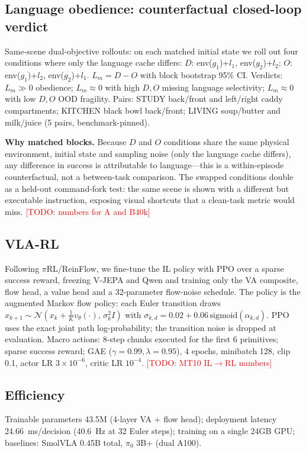 \documentclass[10pt,twocolumn]{article}
\newcommand{\todo}[1]{\textcolor{red}{[TODO: #1]}}
\begin{document}
\subsection{Language obedience: counterfactual closed-loop verdict}
\label{sec:obedience}
Same-scene dual-objective rollouts: on each matched initial state we roll out
four conditions where only the language cache differs:
$D$: env($g_1$)+$l_1$, env($g_2$)+$l_2$; $O$: env($g_1$)+$l_2$,
env($g_2$)+$l_1$. $L_m = D-O$ with block bootstrap 95\% CI. Verdicts:
$L_m\gg0$ obedience; $L_m\approx0$ with high $D,O$ missing language
selectivity; $L_m\approx0$ with low $D,O$ OOD fragility. Pairs: STUDY
back/front and left/right caddy compartments; KITCHEN black bowl
back/front; LIVING soup/butter and milk/juice (5 pairs, benchmark-pinned).

\textbf{Why matched blocks.} Because $D$ and $O$ conditions share the same
physical environment, initial state and sampling noise (only the language
cache differs), any difference in success is attributable to language---this
is a within-episode counterfactual, not a between-task comparison. The
swapped conditions double as a held-out command-fork test: the same scene is
shown with a different but executable instruction, exposing visual shortcuts
that a clean-task metric would miss. \todo{numbers for A and B40k}

\subsection{VLA-RL}
\label{sec:rl}
Following $\pi$RL/ReinFlow, we fine-tune the IL policy with PPO over a sparse
success reward, freezing V-JEPA and Qwen and training only the VA composite,
flow head, a value head and a 32-parameter flow-noise schedule. The policy is
the augmented Markov flow policy: each Euler transition draws
$x_{k+1}\sim\mathcal N(x_k+\frac1K v_\theta(\cdot),\,\sigma_k^2 I)$ with
$\sigma_{k,d}=0.02+0.06\,\mathrm{sigmoid}(\alpha_{k,d})$. PPO uses the exact
joint path log-probability; the transition noise is dropped at evaluation.
Macro actions: 8-step chunks executed for the first 6 primitives; sparse
success reward; GAE ($\gamma=0.99,\lambda=0.95$), 4 epochs, minibatch 128,
clip 0.1, actor LR $3\times10^{-6}$, critic LR $10^{-4}$.
\todo{MT10 IL$\rightarrow$RL numbers}

\subsection{Efficiency}
\label{sec:efficiency}
Trainable parameters 43.5M (4-layer VA + flow head); deployment latency
24.66~ms/decision (40.6~Hz at 32 Euler steps); training on a single 24GB GPU;
baselines: SmolVLA 0.45B total, $\pi_0$ 3B+ (dual A100).
\end{document}
